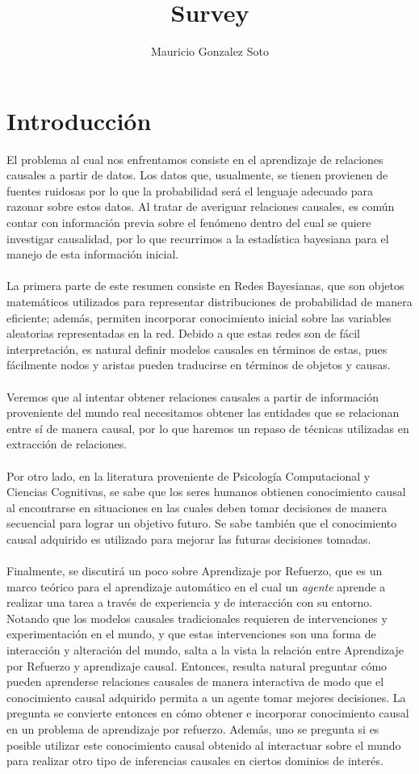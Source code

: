 \documentclass[11pt]{article}
\title{Survey}
\author{Mauricio Gonzalez Soto}
\theoremstyle{plain}
\begin{document}
\nocite{*}
\maketitle
\tableofcontents
\newpage
\section{Introducción}
El problema al cual nos enfrentamos consiste en el aprendizaje de relaciones causales a partir de datos. Los datos que, usualmente, se tienen provienen de fuentes ruidosas por lo que la probabilidad será el lenguaje adecuado para razonar sobre estos datos. Al tratar de averiguar relaciones causales, es común contar con información previa sobre el fenómeno dentro del cual se quiere investigar causalidad, por lo que recurrimos a la estadística bayesiana para el manejo de esta información inicial.\\
\\
La primera parte de este resumen consiste en Redes Bayesianas, que son objetos matemáticos utilizados para representar distribuciones de probabilidad de manera eficiente; además, permiten incorporar conocimiento inicial sobre las variables aleatorias representadas en la red. Debido a que estas redes son de fácil interpretación, es natural definir modelos causales en términos de estas, pues fácilmente nodos y aristas pueden traducirse en términos de objetos y causas.\\
\\
Veremos que al intentar obtener relaciones causales a partir de información proveniente del mundo real necesitamos obtener las entidades que se relacionan entre sí de manera causal, por lo que haremos un repaso de técnicas utilizadas en extracción de relaciones.\\
\\
Por otro lado, en la literatura proveniente de Psicología Computacional y Ciencias Cognitivas, se sabe que los seres humanos obtienen conocimiento causal al encontrarse en situaciones en las cuales deben tomar decisiones de manera secuencial para lograr un objetivo futuro. Se sabe también que el conocimiento causal adquirido es utilizado para mejorar las futuras decisiones tomadas.\\
\\
Finalmente, se discutirá un poco sobre Aprendizaje por Refuerzo, que es un marco teórico para el aprendizaje automático en el cual un \textit{agente} aprende a realizar una tarea a través de experiencia y de interacción con su entorno. Notando que los modelos causales tradicionales requieren de intervenciones y experimentación en el mundo, y que estas intervenciones son una forma de interacción y alteración del mundo, salta a la vista la relación entre Aprendizaje por Refuerzo y aprendizaje causal. Entonces, resulta natural preguntar cómo pueden aprenderse relaciones causales de manera interactiva de modo que el conocimiento causal adquirido permita a un agente tomar mejores decisiones. La pregunta se convierte entonces en cómo obtener e incorporar conocimiento causal en un problema de aprendizaje por refuerzo. Además, uno se pregunta si es posible utilizar este conocimiento causal obtenido al interactuar sobre el mundo para realizar otro tipo de inferencias causales en ciertos dominios de interés.
\end{document}
